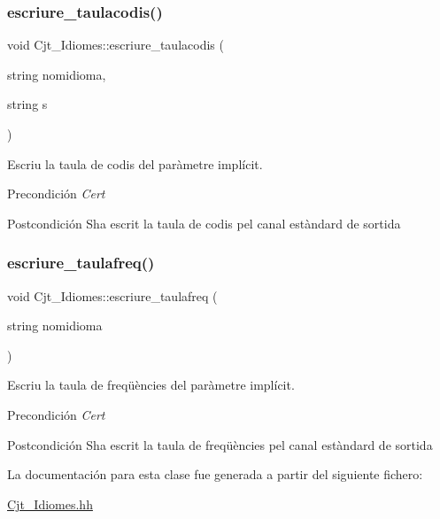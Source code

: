 \subsubsection{\texorpdfstring{escriure\+\_\+taulacodis()}{escriure\_taulacodis()}}
{\footnotesize\ttfamily void Cjt\+\_\+\+Idiomes\+::escriure\+\_\+taulacodis (\begin{DoxyParamCaption}\item[{string}]{nomidioma,  }\item[{string}]{s }\end{DoxyParamCaption})}



Escriu la taula de codis del paràmetre implícit. 

\begin{DoxyPrecond}{Precondición}
{\itshape Cert} 
\end{DoxyPrecond}
\begin{DoxyPostcond}{Postcondición}
S\textquotesingle{}ha escrit la taula de codis pel canal estàndard de sortida 
\end{DoxyPostcond}
\mbox{\label{class_cjt___idiomes_a98862ab41b59ac71eca4408e2b6bf6f0}} 
\subsubsection{\texorpdfstring{escriure\+\_\+taulafreq()}{escriure\_taulafreq()}}
{\footnotesize\ttfamily void Cjt\+\_\+\+Idiomes\+::escriure\+\_\+taulafreq (\begin{DoxyParamCaption}\item[{string}]{nomidioma }\end{DoxyParamCaption})}



Escriu la taula de freqüències del paràmetre implícit. 

\begin{DoxyPrecond}{Precondición}
{\itshape Cert} 
\end{DoxyPrecond}
\begin{DoxyPostcond}{Postcondición}
S\textquotesingle{}ha escrit la taula de freqüències pel canal estàndard de sortida 
\end{DoxyPostcond}


La documentación para esta clase fue generada a partir del siguiente fichero\+:\begin{DoxyCompactItemize}
\item 
\hyperlink{_cjt___idiomes_8hh}{Cjt\+\_\+\+Idiomes.\+hh}\end{DoxyCompactItemize}
